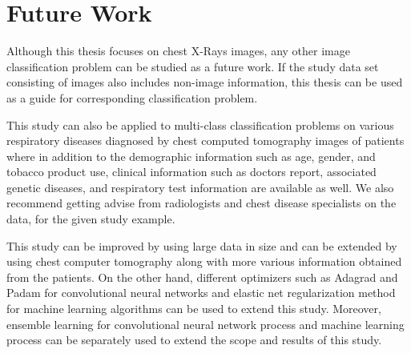 \section{Future Work}

Although this thesis focuses on chest X-Rays images, any other image classification problem can be studied as a future work. If the study data set consisting of images also includes non-image information, this thesis can be used as a guide for corresponding classification problem.

This study can also be applied to multi-class classification problems on various respiratory diseases diagnosed by chest computed tomography images of patients where in addition to the demographic information such as age, gender, and tobacco product use, clinical information such as doctors report,  associated genetic diseases, and respiratory test information are available as well. We also recommend getting advise from radiologists and chest disease specialists on the data, for the given study example.

This study can be improved by using large data in size and can be extended by using chest computer tomography along with more various information obtained from the patients. On the other hand, different optimizers such as Adagrad \cite{adagrad} and Padam \cite{padam} for convolutional neural networks and elastic net regularization method \cite{elasticnet_paper} for machine learning algorithms can be used to extend this study. Moreover, ensemble learning \cite{ensemble_learning} for convolutional neural network process and machine learning process can be separately used to extend the scope and results of this study.